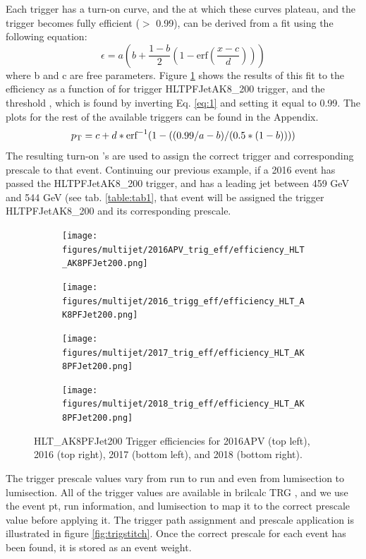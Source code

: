 Each trigger has a turn-on curve, and the \pt at which these curves plateau, and the trigger becomes fully efficient ($>$ 0.99), can be derived from a fit using the following equation:
\begin{equation} \label{eq:2}
  \epsilon = a\left(b+\frac{1-b}{2}\left(1-\text{erf}\left(\frac{x-c}{d}\right)\right)\right)
\end{equation}
where b and c are free parameters. Figure \ref{fig:4} shows the results of this fit to the efficiency as a function of \pt for trigger HLTPFJetAK8\_200 trigger, and the threshold \pt, which is found by inverting Eq. \ref{eq:1} and setting it equal to 0.99. The plots for the rest of the available triggers can be found in the Appendix.
\begin{equation}
{\ensuremath{p_{\mathrm{T}}}}  =c+d*\text{erf}^{-1}(1-((0.99/a - b)/(0.5*(1-b))))
\end{equation}
The resulting turn-on \pt's are used to assign the correct trigger and corresponding prescale to that event. Continuing our previous example, if a 2016 event has passed the HLTPFJetAK8\_200 trigger, and has a leading jet \pt between 459 GeV and 544 GeV (see tab. \ref{table:tab1}, that event will be assigned the trigger HLTPFJetAK8\_200 and its corresponding prescale.
\begin{figure}[h!]
	\centering
	\begin{subfigure}
		\centering
		\texttt{[image: figures/multijet/2016APV\_trig\_eff/efficiency\_HLT\_AK8PFJet200.png]}
	\end{subfigure}%
	\begin{subfigure}
		\centering
		\texttt{[image: figures/multijet/2016\_trigg\_eff/efficiency\_HLT\_AK8PFJet200.png]}
	\end{subfigure}
	\begin{subfigure}
		\centering
		\texttt{[image: figures/multijet/2017\_trig\_eff/efficiency\_HLT\_AK8PFJet200.png]}
	\end{subfigure}%
	\begin{subfigure}
		\centering
		\texttt{[image: figures/multijet/2018\_trig\_eff/efficiency\_HLT\_AK8PFJet200.png]}
	\end{subfigure}
	\caption{HLT\_AK8PFJet200 Trigger efficiencies for 2016APV (top left), 2016 (top right), 2017 (bottom left), and 2018 (bottom right).}
	\label{fig:4}
\end{figure}
The trigger prescale values vary from run to run and even from lumisection to lumisection. All of the trigger values are available in brilcalc TRG \cite{brilcalc}, and we use the event pt, run information, and lumisection to map it to the correct prescale value before applying it. The trigger path assignment and prescale application is illustrated in figure \ref{fig:trigstitch}. Once the correct prescale for each event has been found, it is stored as an event weight.
